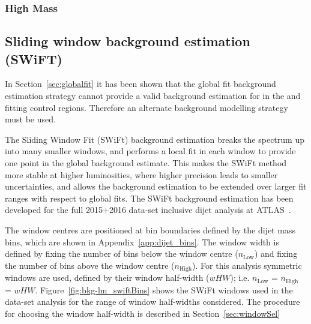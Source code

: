 \subsubsection{High Mass}
\label{sec:highmass_globalFit}

\subsection{Sliding window background estimation (SWiFT)}
\label{sec:swift}

In Section~\ref{sec:globalfit} it has been shown that the global fit background estimation strategy cannot provide a
valid background estimation for in the \hm{} and \lm{} fitting control regions.
Therefore an alternate background modelling strategy must be used.

The Sliding Window Fit (SWiFt) background estimation breaks the spectrum up into many smaller windows,
and performs a local fit in each window to provide one point in the global background \mjj{} estimate. 
This makes the SWiFt method more stable at higher luminosities, where higher precision leads to smaller uncertainties,
and allows the background estimation to be extended over larger fit ranges with respect to global fits.
The SWiFt background estimation has been developed for the full 2015+2016 data-set inclusive dijet analysis at ATLAS~\cite{dijet_mori17_paper}.

The window centres are positioned at bin boundaries defined by the dijet mass bins, which are shown in Appendix~\ref{app:dijet_bins}.
The window width is defined by fixing the number of bins below the window centre ($n_{\text{Low}}$)
and fixing the number of bins above the window centre ($n_{\text{High}}$).
For this analysis symmetric windows are used, defined by their window half-width ($wHW$); i.e. $n_{\text{Low}}$ = $n_{\text{High}}$ = $wHW$.
Figure~\ref{fig:bkg-lm_swiftBins} shows the SWiFt windows used in the \lm{} data-set analysis for the range of window half-widths considered.
The procedure for choosing the window half-width is described in Section~\ref{sec:windowSel}

